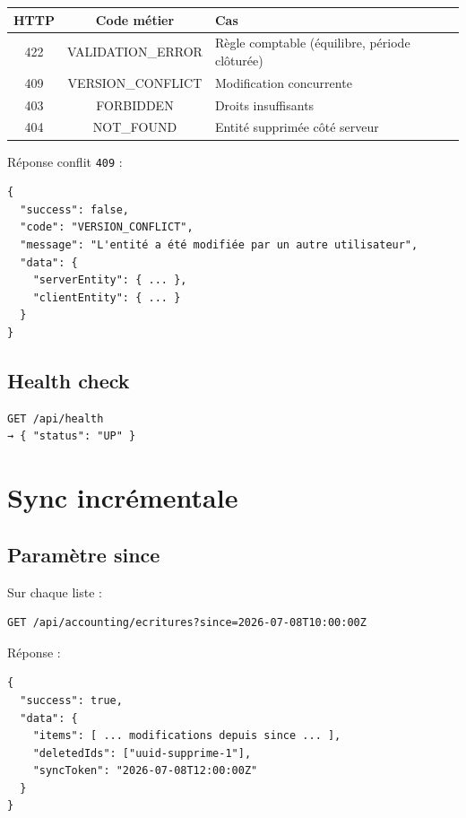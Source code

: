\documentclass[12pt,a4paper]{report}
\begin{document}
\begin{longtable}{@{}ccp{7cm}@{}}
\hline
\textbf{HTTP} & \textbf{Code métier} & \textbf{Cas} \\
\hline
\endhead
422 & VALIDATION\_ERROR & Règle comptable (équilibre, période clôturée) \\
\hline
409 & VERSION\_CONFLICT & Modification concurrente \\
\hline
403 & FORBIDDEN & Droits insuffisants \\
\hline
404 & NOT\_FOUND & Entité supprimée côté serveur \\
\hline
\end{longtable}

Réponse conflit \texttt{409} :
\begin{verbatim}
{
  "success": false,
  "code": "VERSION_CONFLICT",
  "message": "L'entité a été modifiée par un autre utilisateur",
  "data": {
    "serverEntity": { ... },
    "clientEntity": { ... }
  }
}
\end{verbatim}

\section{Health check}

\begin{verbatim}
GET /api/health
→ { "status": "UP" }
\end{verbatim}

\chapter{Sync incrémentale}

\section{Paramètre since}

Sur chaque liste :

\begin{verbatim}
GET /api/accounting/ecritures?since=2026-07-08T10:00:00Z
\end{verbatim}

Réponse :
\begin{verbatim}
{
  "success": true,
  "data": {
    "items": [ ... modifications depuis since ... ],
    "deletedIds": ["uuid-supprime-1"],
    "syncToken": "2026-07-08T12:00:00Z"
  }
}
\end{verbatim}
\end{document}
